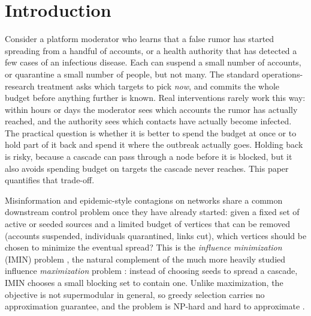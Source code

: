 \documentclass[ijoc,sglanonrev]{informs4}
\begin{document}


\maketitle

\section{Introduction}\label{sec:intro}

Consider a platform moderator who learns that a false rumor has started
spreading from a handful of accounts, or a health authority that has detected
a few cases of an infectious disease. Each can suspend a small number of
accounts, or quarantine a small number of people, but not many. The standard
operations-research treatment asks which targets to pick \emph{now}, and
commits the whole budget before anything further is known. Real interventions
rarely work this way: within hours or days the moderator sees which accounts
the rumor has actually reached, and the authority sees which contacts have
actually become infected. The practical question is whether it is better to
spend the budget at once or to hold part of it back and spend it where the
outbreak actually goes. Holding back is risky, because a cascade can pass
through a node before it is blocked, but it also avoids spending budget on
targets the cascade never reaches. This paper quantifies that trade-off.

Misinformation and epidemic-style contagions on networks share a common
downstream control problem once they have already started: given a fixed
set of active or seeded sources and a limited budget of vertices that can be
removed (accounts suspended, individuals quarantined, links cut), which
vertices should be chosen to minimize the eventual spread? This is the
\emph{influence minimization} (IMIN) problem \citep{xie2023,xie2024}, the
natural complement of the much more heavily studied influence
\emph{maximization} problem \citep{kempe2003}: instead of choosing seeds to
spread a cascade, IMIN chooses a small blocking set to contain one. Unlike
maximization, the objective is not supermodular in general, so greedy
selection carries no approximation guarantee, and the problem is NP-hard and
hard to approximate \citep{xie2023}.
\end{document}
